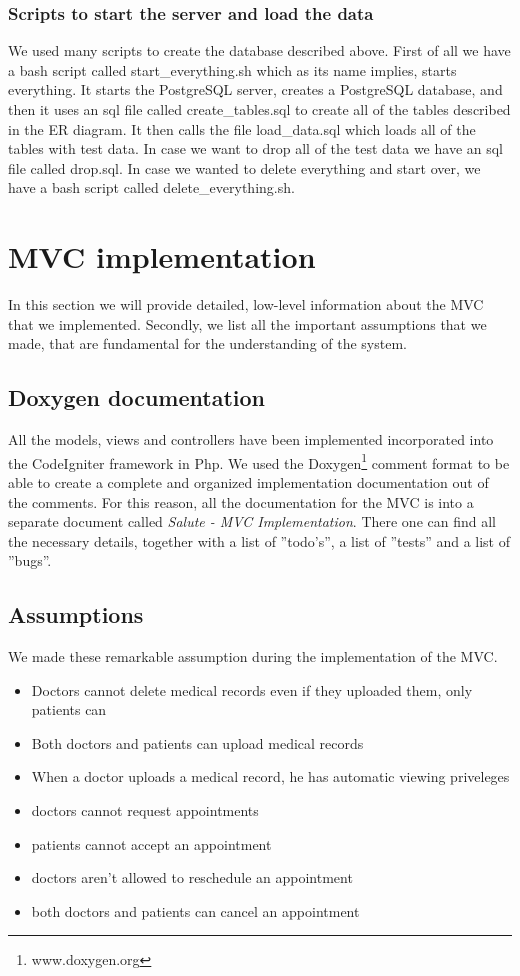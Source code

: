 \documentclass[12pt]{report}
\begin{document}
\subsubsection{Scripts to start the server and load the data}
We used many scripts to create the database described above.  First of all we have a bash script called start\_everything.sh which as its name implies, starts everything.  It starts the PostgreSQL server, creates a PostgreSQL database, and then it uses an sql file called create\_tables.sql to create all of the tables described in the ER diagram.  It then calls the file load\_data.sql which loads all of the tables with test data.  In case we want to drop all of the test data we have an sql file called drop.sql.  In case we wanted to delete everything and start over, we have a bash script called delete\_everything.sh. 

\section{MVC implementation}
In this section we will provide detailed, low-level information about the MVC that we implemented. Secondly, we list all the important assumptions that we made, that are fundamental for the understanding of the system.

\subsection{Doxygen documentation}
All the models, views and controllers have been implemented incorporated into the CodeIgniter framework in Php. We used the Doxygen\footnote{www.doxygen.org} comment format to be able to create a complete and organized implementation documentation out of the comments. For this reason, all the documentation for the MVC is into a separate document called \emph{Salute - MVC Implementation}. There one can find all the necessary details, together with a list of ''todo's'', a list of ''tests'' and a list of ''bugs''.

\subsection{Assumptions}
We made these remarkable assumption during the implementation of the MVC.
\begin{itemize}
\item Doctors cannot delete medical records even if they uploaded them, only patients can
\item Both doctors and patients can upload medical records
\item When a doctor uploads a medical record, he has automatic viewing priveleges
\item doctors cannot request appointments
\item patients cannot accept an appointment
\item doctors aren't allowed to reschedule an appointment
\item both doctors and patients can cancel an appointment
\end{itemize}
\end{document}
